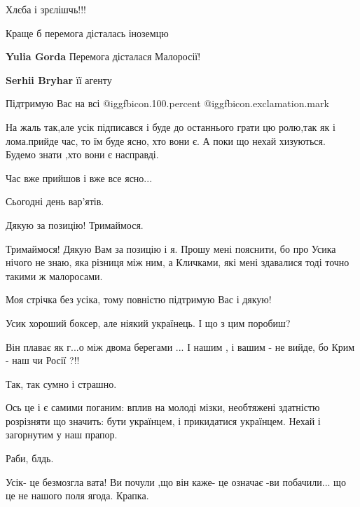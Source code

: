 \begin{itemize}
\begin{itemize}
\end{itemize} %

Хлєба і зрєлішчь!!!

Краще б перемога дісталась іноземцю

\begin{itemize} %
\textbf{Yulia Gorda} Перемога дісталася Малоросії!

\textbf{Serhii Bryhar} її агенту
\end{itemize} %

Підтримую Вас на всі  @igg{fbicon.100.percent} @igg{fbicon.exclamation.mark} 


На жаль так,але усік підписався і буде до останнього грати цю ролю,так як і
лома.прийде час, то їм буде ясно, хто вони є. А поки що нехай хизуються. Будемо
знати ,хто вони є насправді.

\begin{itemize} %
Час вже прийшов і вже все ясно...
\end{itemize} %

Сьогодні день вар'ятів.

Дякую за позицію! Тримаймося.

Тримаймося! Дякую Вам за позицію і я.
Прошу мені пояснити, бо про Усика нічого не знаю, яка різниця між ним, а Кличками, які мені здавалися тоді точно такими ж малоросами.

Моя стрічка без усіка, тому повністю підтримую Вас і дякую!

Усик хороший боксер, але ніякий українець. І що з цим поробиш?

Він плаває як г...о між двома берегами ...
І нашим , і вашим - не вийде, бо Крим - наш чи Росії ?!!

Так, так сумно і страшно.


Ось це і є самими поганим: вплив на молоді мізки, необтяжені здатністю
розрізняти що значить: бути українцем, і прикидатися українцем. Нехай і
загорнутим у наш прапор.


Раби, блдь.

Усік- це безмозгла вата! Ви почули ,що він каже- це означає -ви побачили... що це не нашого поля ягода. Крапка.


\end{itemize}
